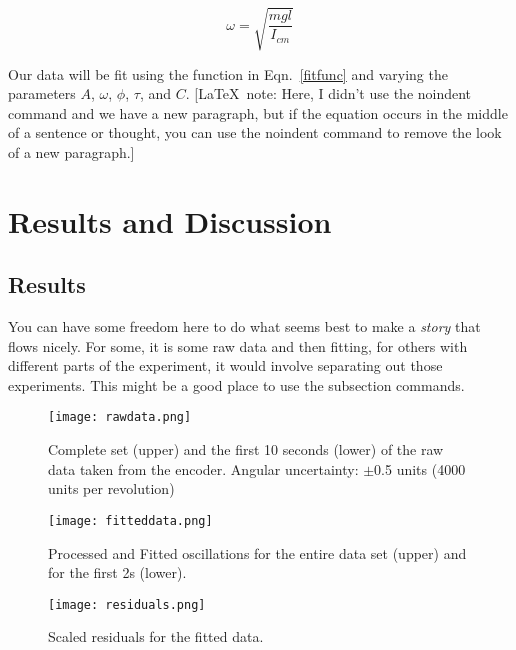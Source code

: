 \documentclass[prb,preprint,groupaddress,showpacs,superbib,floats]{revtex4-1}
\begin{document}
\begin{equation}
\omega = \sqrt{\frac{mgl}{I_{cm}}}
\end{equation}

Our data will be fit using the function in Eqn.~\ref{fitfunc} and varying the parameters $A$, $\omega$, $\phi$, $\tau$, and $C$. [\LaTeX\ note:  Here, I didn't use the noindent command and we have a new paragraph, but if the equation occurs in the middle of a sentence or thought, you can use the noindent command to remove the look of a new paragraph.]


\section{Results and Discussion}\label{results}

\subsection{Results}

You can have some freedom here to do what seems best to make a \textit{story} that flows nicely. For some, it is some raw data and then fitting, for others with different parts of the experiment, it would involve separating out those experiments.  This might be a good place to use the subsection commands.



%
\begin{figure}[t]
	\centering
	\texttt{[image: rawdata.png]}
	\caption{Complete set (upper) and the first 10 seconds (lower) of the raw data taken from the encoder.  Angular uncertainty: $\pm$0.5 units (4000 units per revolution)}
	\label{rawdata}
\end{figure}

%
\begin{figure}[t]
	\centering
	\texttt{[image: fitteddata.png]}
	\caption{Processed and Fitted oscillations for the entire data set (upper) and for the first 2s (lower).}
	\label{fitteddata}
\end{figure}

%
\begin{figure}[th]
	\centering
	\texttt{[image: residuals.png]}
	\caption{Scaled residuals for the fitted data.}
	\label{residuals}
\end{figure}
\end{document}
